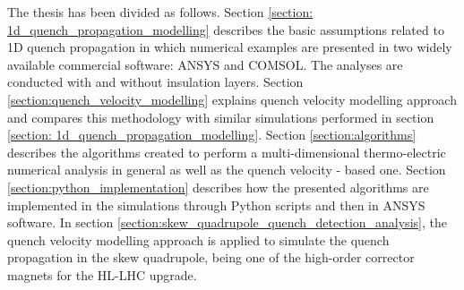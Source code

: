 
The thesis has been divided as follows. Section \ref{section: 1d_quench_propagation_modelling} describes the basic assumptions related to 1D quench propagation in which numerical examples are presented in two widely available commercial software: ANSYS and COMSOL. The analyses are conducted with and without insulation layers. Section \ref{section:quench_velocity_modelling} explains quench velocity modelling approach and compares this methodology with similar simulations performed in section \ref{section: 1d_quench_propagation_modelling}. Section \ref{section:algorithms} describes the algorithms created to perform a multi-dimensional thermo-electric numerical analysis in general as well as the quench velocity - based one. Section \ref{section:python_implementation} describes how the presented algorithms are implemented in the simulations through Python scripts and then in ANSYS software. In section \ref{section:skew_quadrupole_quench_detection_analysis}, the quench velocity modelling approach is applied to simulate the quench propagation in the skew quadrupole, being one of the high-order corrector magnets for the HL-LHC upgrade.